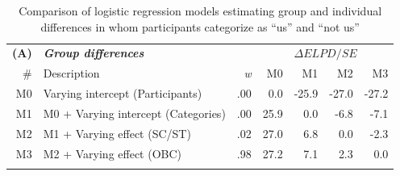 \documentclass[12pt, a4paper]{article}
\begin{document}
\begin{table}
\caption{Comparison of logistic regression models estimating group and individual differences in whom participants categorize as “us” and “not us”}
\centering
{}
\small
\begin{tabularx}{\linewidth}{rXrrrrr} \toprule
\textbf{(A)} & \textit{\textbf{Group differences}} & \multicolumn{1}{l}{} & \multicolumn{4}{c}{$\Delta\textit{ELPD}/\textit{SE}$}                                                                                    \\ \cmidrule{4-7}
\#           & Description                         & \textit{w}           & M0                          & M1                           & M2                           & M3                           \\ \midrule
M0           & Varying intercept (Participants)    & .00                  & {\color[HTML]{E0E0E0} 0.0}  & {\color[HTML]{B2182B} -25.9} & {\color[HTML]{B2182B} -27.0} & {\color[HTML]{B2182B} -27.2} \\
M1           & M0 + Varying intercept (Categories) & .00                  & {\color[HTML]{2166AC} 25.9} & {\color[HTML]{E0E0E0} 0.0}   & {\color[HTML]{B2182B} -6.8}  & {\color[HTML]{B2182B} -7.1}  \\
M2           & M1 + Varying effect (SC/ST)         & .02                  & {\color[HTML]{2166AC} 27.0} & {\color[HTML]{2166AC} 6.8}   & {\color[HTML]{E0E0E0} 0.0}   & {\color[HTML]{F4A582} -2.3}  \\
M3           & M2 + Varying effect (OBC)           & .98                  & {\color[HTML]{2166AC} 27.2} & {\color[HTML]{2166AC} 7.1}   & {\color[HTML]{92C5DE} 2.3}   & {\color[HTML]{E0E0E0} 0.0}   \\ \bottomrule \addlinespace
\end{tabularx}


\end{table}
\end{document}
